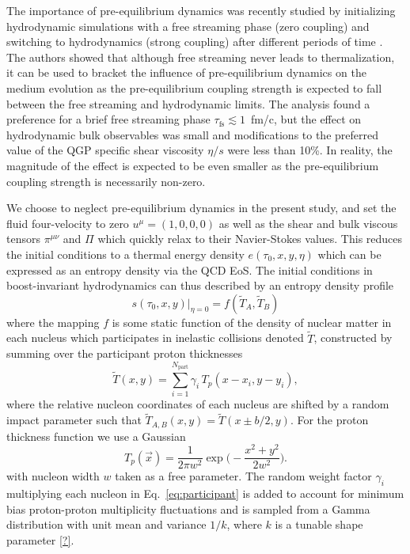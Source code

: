 \documentclass[aps,prc,reprint,amsmath,nofootinbib,superscriptaddress]{revtex4-1}
\newcommand{\T}{\tilde{T}}
\begin{document}
The importance of pre-equilibrium dynamics was recently studied by initializing hydrodynamic simulations with a free streaming phase (zero coupling) and switching to hydrodynamics (strong coupling) after different periods of time \cite{Liu:2015nwa}. The authors showed that although free streaming never leads to thermalization, it can be used to bracket the influence of pre-equilibrium dynamics on the medium evolution as the pre-equilibrium coupling strength is expected to fall between the free streaming and hydrodynamic limits. The analysis found a preference for a brief free streaming phase ${\tau_\text{fs} \lesssim 1}$~fm/c, but the effect on hydrodynamic bulk observables was small and modifications to the preferred value of the QGP specific shear viscosity $\eta/s$ were less than 10\%. In reality, the magnitude of the effect is expected to be even smaller as the pre-equilibrium coupling strength is necessarily non-zero.

We choose to neglect pre-equilibrium dynamics in the present study, and set the fluid four-velocity to zero ${u^\mu = (1,0,0,0)}$ as well as the shear and bulk viscous tensors $\pi^{\mu\nu}$ and $\Pi$ which quickly relax to their Navier-Stokes values. This reduces the initial conditions to a thermal energy density $e(\tau_0, x, y, \eta)$ which can be expressed as an entropy density via the QCD EoS. The initial conditions in boost-invariant hydrodynamics can thus described by an entropy density profile
\begin{equation}
  s(\tau_0, x, y)\vert_{\eta=0} = f(\T_A, \T_B)
  \label{eq:mapping}
\end{equation}
where the mapping $f$ is some static function of the density of nuclear matter in each nucleus which participates in inelastic collisions denoted $\T$, constructed by summing over the participant proton thicknesses
\begin{equation}
  \T(x, y) = \sum\limits_{i=1}^{N_\text{part}} \gamma_i\, T_p(x - x_i, y - y_i),
  \label{eq:participant}
\end{equation}
where the relative nucleon coordinates of each nucleus are shifted by a random impact parameter such that ${\T_{A,B}(x, y) = \T(x \pm b/2, y)}$. For the proton thickness function we use a Gaussian
\begin{equation}
  T_p(\vec{x}) = \frac{1}{2\pi w^2} \exp\bigg(\!-\frac{x^2 + y^2}{2 w^2}\bigg).
\end{equation}
with nucleon width $w$ taken as a free parameter. The random weight factor $\gamma_i$ multiplying each nucleon in Eq.~\eqref{eq:participant} is added to account for minimum bias proton-proton multiplicity fluctuations and is sampled from a Gamma distribution with unit mean and variance $1/k$, where $k$ is a tunable shape parameter \ref{?}.
\end{document}
